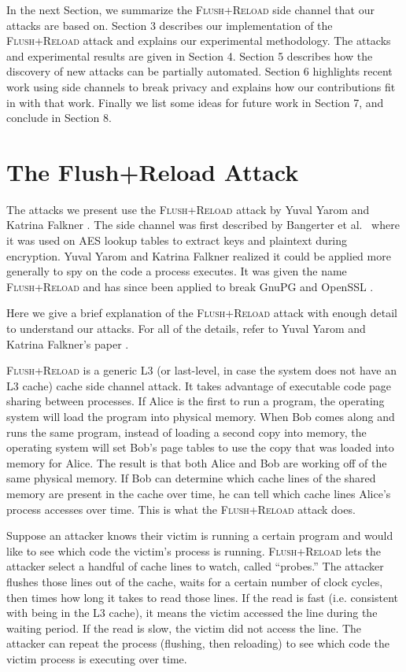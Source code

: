 \documentclass[letterpaper,twocolumn,10pt]{article}
\begin{document}
In the next Section, we summarize the \textsc{Flush+Reload} side channel that
our attacks are based on. Section 3 describes our implementation of the
\textsc{Flush+Reload} attack and explains our experimental methodology. The
attacks and experimental results are given in Section 4. Section 5 describes how
the discovery of new attacks can be partially automated. Section 6 highlights
recent work using side channels to break privacy and explains how our
contributions fit in with that work. Finally we list some ideas for future work
in Section 7, and conclude in Section 8.

\section{The Flush+Reload Attack}

The attacks we present use the \textsc{Flush+Reload} attack by Yuval Yarom and
Katrina Falkner \cite{yarom2013flush}. The side channel was first described by
Bangerter et al.\ \cite{gullasch2011cache} where it was used on AES lookup
tables to extract keys and plaintext during encryption. Yuval Yarom and Katrina
Falkner realized it could be applied more generally to spy on the code a process
executes. It was given the name \textsc{Flush+Reload} and has since been applied
to break GnuPG \cite{yarom2013flush} and OpenSSL \cite{benger2014ooh,
yarom2014recovering}.

Here we give a brief explanation of the \textsc{Flush+Reload} attack with enough
detail to understand our attacks. For all of the details, refer to Yuval Yarom
and Katrina Falkner's paper \cite{yarom2013flush}.

\textsc{Flush+Reload} is a generic L3 (or last-level, in case the system does
not have an L3 cache) cache side channel attack. It takes advantage of
executable code page sharing between processes. If Alice is the first to run
a program, the operating system will load the program into physical memory. When
Bob comes along and runs the same program, instead of loading a second copy into
memory, the operating system will set Bob's page tables to use the copy that was
loaded into memory for Alice. The result is that both Alice and Bob are working
off of the same physical memory. If Bob can determine which cache lines of the
shared memory are present in the cache over time, he can tell which cache lines
Alice's process accesses over time. This is what the \textsc{Flush+Reload}
attack does.

Suppose an attacker knows their victim is running a certain program and would
like to see which code the victim's process is running. \textsc{Flush+Reload}
lets the attacker select a handful of cache lines to watch, called ``probes.''
The attacker flushes those lines out of the cache, waits for a certain number of
clock cycles, then times how long it takes to read those lines. If the read is
fast (i.e. consistent with being in the L3 cache), it means the victim accessed
the line during the waiting period. If the read is slow, the victim did not
access the line. The attacker can repeat the process (flushing, then reloading)
to see which code the victim process is executing over time.
\end{document}
